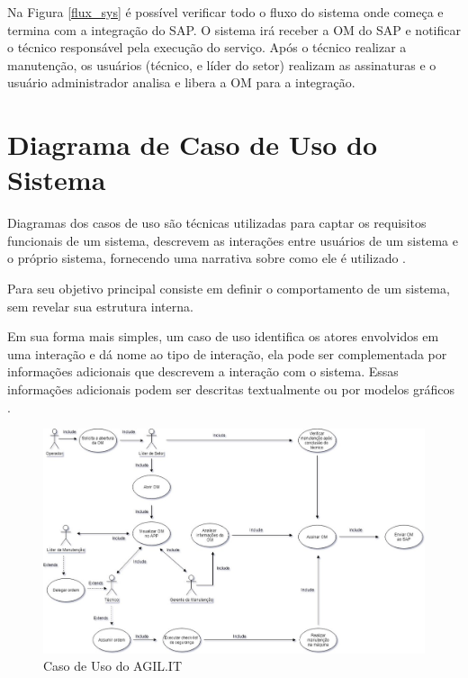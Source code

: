 Na Figura \ref{flux_sys} é possível verificar todo o fluxo do sistema onde começa e termina com a integração do SAP.
O sistema irá receber a OM do SAP e notificar o técnico responsável pela execução do serviço. Após o técnico realizar a manutenção, os usuários (técnico, e líder do setor) realizam as assinaturas e o usuário administrador analisa e libera a OM para a integração.

	
\section{Diagrama de Caso de Uso do Sistema}

Diagramas dos casos de uso são técnicas utilizadas para captar os requisitos funcionais de um sistema, descrevem as interações entre usuários de um sistema e o próprio sistema, fornecendo uma narrativa sobre como ele é utilizado \cite{umlessencial2005}.
	
Para \cite{carniello2003} seu objetivo principal consiste em definir o comportamento de um sistema, sem revelar sua estrutura interna.

Em sua forma mais simples, um caso de uso identifica os atores envolvidos em uma interação e dá nome ao tipo de interação, ela pode ser complementada por informações adicionais que descrevem a interação com o sistema. Essas informações adicionais podem ser descritas textualmente ou por modelos gráficos \cite{sommerville2011software}.

\begin{figure}[htb]
	\caption{\label{caso_uso}Caso de Uso do AGIL.IT}
	\begin{center}
		\includegraphics[scale=0.57]{./Figuras/caso-uso.png}
	\end{center}
\end{figure}

